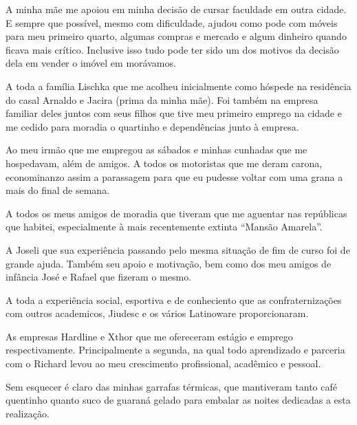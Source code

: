 
A minha mãe me apoiou em minha decisão de cursar faculdade em outra cidade. E
sempre que possível, mesmo com dificuldade, ajudou como pode com móveis para meu
primeiro quarto, algumas compras e mercado e algum dinheiro quando ficava mais
crítico. Inclusive isso tudo pode ter sido um dos motivos da decisão dela em
vender o imóvel em morávamos.

A toda a família Lischka que me acolheu inicialmente como hóspede na residência
do casal Arnaldo e Jacira (prima da minha mãe). Foi também na empresa familiar
deles juntos com seus filhos que tive meu primeiro emprego na cidade e me cedido
para moradia o quartinho e dependências junto à empresa.

Ao meu irmão que me empregou as sábados e minhas cunhadas que me hospedavam, além de amigos. A todos os motoristas que me deram carona, econominanzo assim a parassagem para que eu pudesse voltar com uma grana a mais do final de semana.

A todos os meus amigos de moradia que tiveram que me aguentar nas repúblicas que habitei, especialmente à mais recentemente extinta ``Mansão Amarela''.

A Joseli que sua experiência passando pelo mesma situação de fim de curso foi de grande ajuda. Também seu apoio e motivação, bem como dos meu amigos de infância José e Rafael que fizeram o mesmo.

A toda a experiência social, esportiva e de conheciento que as confraternizações com outros academicos, Jiudesc e os vários Latinoware proporcionaram.

As empresas Hardline e Xthor que me ofereceram estágio e emprego respectivamente. Principalmente a segunda, na qual todo aprendizado e parceria com o Richard levou ao meu crescimento profissional, acadêmico e pessoal.

Sem esquecer é claro das minhas garrafas térmicas, que mantiveram tanto café quentinho quanto suco de guaraná gelado para embalar as noites dedicadas a esta realização.
